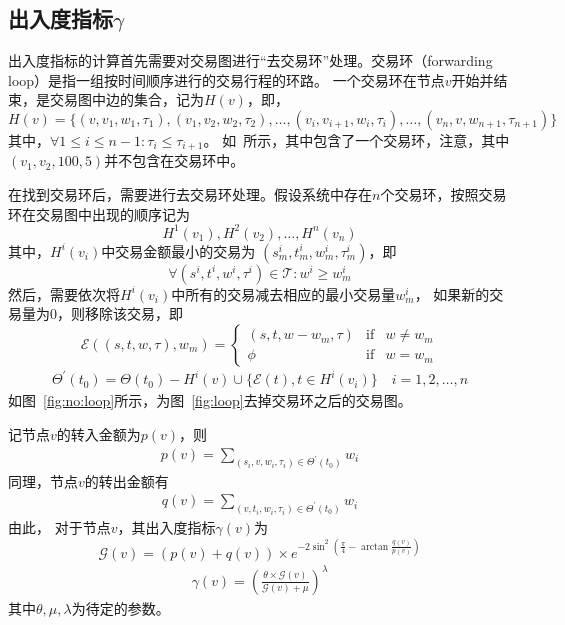 \subsection*{出入度指标$\gamma$}
出入度指标的计算首先需要对交易图进行“去交易环”处理。交易环（forwarding loop）是指一组按时间顺序进行的交易行程的环路。
一个交易环在节点$v$开始并结束，是交易图中边的集合，记为$H(v)$，即，
\[
H(v) = \{(v, v_1, w_1, \tau_1), (v_1, v_2, w_2, \tau_2), \dots, (v_i, v_{i+1}, w_{i}, \tau_i), \dots, (v_n, v, w_{n+1}, \tau_{n+1})\}
\]
\noindent 其中，$\forall 1\le i \le {n-1} : \tau_i \le \tau_{i+1} $。
\noindent 如~所示，其中包含了一个交易环，注意，其中$(v_1, v_2, 100, 5)$并不包含在交易环中。




在找到交易环后，需要进行去交易环处理。假设系统中存在$n$个交易环，按照交易环在交易图中出现的顺序记为
\[
H^1(v_1), H^2(v_2), \dots, H^n(v_n)\]
\noindent 其中，$H^i(v_i)$中交易金额最小的交易为 $(s^i_m, t^i_m, w^i_m, \tau^i_m)$，即
\[
\forall (s^i, t^i, w^i, \tau^i) \in \mathcal{T} : w^i \ge w^i_m
\]
\noindent 然后，需要依次将$H^i(v_i)$中所有的交易减去相应的最小交易量$w^i_m$，
如果新的交易量为0，则移除该交易，即
\[
\mathcal{E}((s, t, w, \tau), w_m) = \left\{ \begin{array}{rcl}
(s, t, w-w_m, \tau) & \mbox{if} & w \ne w_m \\
\phi & \mbox{if} & w = w_m
\end{array}\right.
\]
\begin{align}
\Theta^{\prime}(t_0)=\Theta(t_0)-H^i(v) \cup \{\mathcal{E}(t), t\in H^i(v_i)\} \quad i = 1, 2,\dots, n
\end{align}
\noindent 如图~\ref{fig:no:loop}所示，为图~\ref{fig:loop}去掉交易环之后的交易图。



记节点$v$的转入金额为$p(v)$，则
\begin{align}
p(v) = \sum_{(s_i, v, w_i, \tau_i) \in \Theta^{\prime}(t_0)}{w_i}
\end{align}
\noindent 同理，节点$v$的转出金额有
\begin{align}
q(v) = \sum_{(v, t_i, w_i, \tau_i) \in \Theta^{\prime}(t_0)}{w_i}
\end{align}
\noindent 由此，
对于节点$v$，其出入度指标$\gamma(v)$为
\[
\mathcal{G}(v) = (p(v) + q(v)) \times{} e^{-2\sin^2{(\frac{\pi}{4} - \arctan\frac{q(v)}{p(v)})}}
\]
\begin{align}
\gamma(v) = (\frac{\theta\times{}\mathcal{G}(v)}{\mathcal{G}(v) + \mu})^{\lambda}
\end{align}
\noindent 其中$\theta, \mu, \lambda$为待定的参数。

